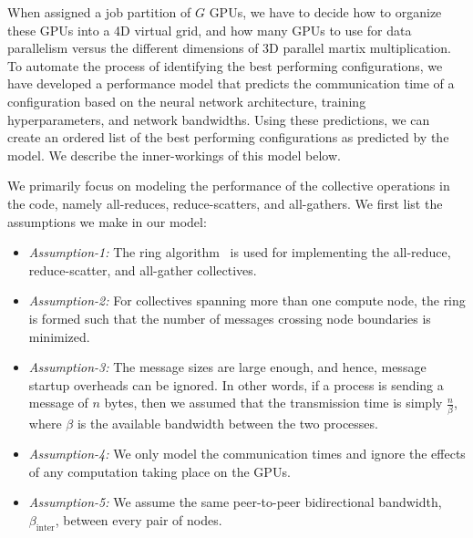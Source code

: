 When assigned a job partition of $G$ GPUs, we have to decide how to organize
these GPUs into a 4D virtual grid, and how many GPUs to use for data
parallelism versus the different dimensions of 3D parallel martix
multiplication. To automate the process of identifying the best performing
configurations, we have developed a performance model that predicts the
communication time of a configuration based on the neural network architecture,
training hyperparameters, and network bandwidths. Using these predictions, we
can create an ordered list of the best performing configurations as predicted by
the model. We describe the inner-workings of this model below.

We primarily focus on modeling the performance of the collective operations in
the code, namely all-reduces, reduce-scatters, and all-gathers.  We first list
the assumptions we make in our model:
%
\begin{itemize}
    \item \emph{Assumption-1:}  
    The ring algorithm~\cite{thakurimproving2003} is used for implementing the all-reduce, reduce-scatter, 
    and all-gather collectives.
    \item \emph{Assumption-2:} For collectives spanning more than one compute node, the ring is formed such that the number of messages crossing node 
    boundaries is minimized.
    \item \emph{Assumption-3:} The message sizes are large enough, and hence, message startup overheads can be 
    ignored. 
    In other words, if a process is sending a message of $n$ bytes, then we assumed that the transmission time is simply 
    $\frac{n}{\beta}$, where $\beta$ is the available bandwidth between the two processes.
    \item \emph{Assumption-4:} We only model the communication times and ignore the effects of any computation taking 
    place on the GPUs.  
    \item \emph{Assumption-5:} We assume the same peer-to-peer bidirectional bandwidth, $\beta_{\mathrm{inter}}$, between every 
    pair of nodes.
\end{itemize}

